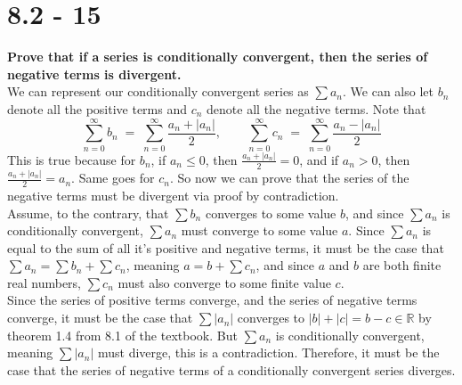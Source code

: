 \documentclass[11pt]{article}
\begin{document}
\section*{8.2 - 15}
\textbf{Prove that if a series is conditionally convergent, then the series of negative terms is 
divergent.} \\ 

We can represent our conditionally convergent series as \(\sum a_n\).  We can also let \(b_n\) denote 
all the positive terms and \(c_n\) denote all the negative terms.  Note that 
\[\sum_{n=0}^{\infty} b_n \;=\; \sum_{n=0}^{\infty} \frac{a_n + |a_n|}{2},\quad\quad 
\sum_{n=0}^{\infty} c_n \;=\; \sum_{n=0}^{\infty} \frac{a_n - |a_n|}{2}\]
This is true because for \(b_n\), if \(a_n \leq 0\), then \(\frac{a_n + |a_n|}{2} = 0\), and if \(a_n > 0\), 
then \(\frac{a_n + |a_n|}{2} = a_n\).  Same goes for \(c_n\).  So now we can prove that the series of the 
negative terms must be divergent via proof by contradiction. \\ 

Assume, to the contrary, that \(\sum b_n\) converges to some value \(b\), and since \(\sum a_n\) is 
conditionally convergent, \(\sum a_n\) must converge to some value \(a\).  Since \(\sum a_n\) is equal 
to the sum of all it's positive and negative terms, it must be the case that \(\sum a_n = 
\sum b_n + \sum c_n\), meaning \(a = b + \sum c_n\), and since \(a\) and \(b\) are both finite real numbers, 
\(\sum c_n\) must also converge to some finite value \(c\). \\

Since the series of positive terms converge, and the series of negative terms converge, it must be the case that 
\(\sum |a_n|\) converges to \(|b| + |c| = b - c \in \mathbb R\) by theorem 1.4 from 8.1 of the textbook. 
But \(\sum a_n\) is conditionally convergent, meaning \(\sum |a_n|\) must diverge, this is a contradiction.
Therefore, it must be the case that the series of negative terms of a conditionally convergent series diverges.
\newpage
\end{document}
